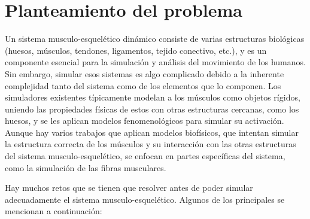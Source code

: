 
\chapter{Planteamiento del problema} %
\label{PlanteamientoProblema} %


Un sistema musculo-esquelético dinámico consiste de varias estructuras biológicas (huesos, músculos, tendones, ligamentos, tejido conectivo, etc.), y es un componente esencial para la simulación y análisis del movimiento de los humanos. Sin embargo, simular esos sistemas es algo complicado debido a la inherente complejidad tanto del sistema como de los elementos que lo componen. Los simuladores existentes típicamente modelan a los músculos como objetos rígidos, uniendo las propiedades físicas de estos con otras estructuras cercanas, como los huesos, y se les aplican modelos fenomenológicos para simular su activación. Aunque hay varios trabajos que aplican modelos biofísicos, que intentan simular la estructura correcta de los músculos y su interacción con las otras estructuras del sistema musculo-esquelético, se enfocan en partes específicas del sistema, como la simulación de las fibras musculares.

Hay muchos retos que se tienen que resolver antes de poder simular adecuadamente el sistema musculo-esquelético. Algunos de los principales se mencionan a continuación:


